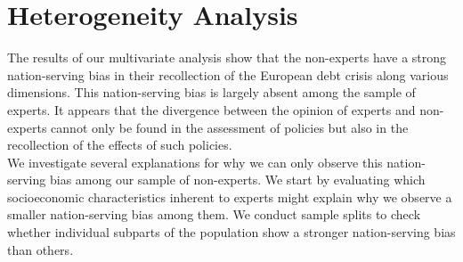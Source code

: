 
\clearpage
\section{Heterogeneity Analysis}
 
The results of our multivariate analysis show that the non-experts have a strong nation-serving bias in their recollection of the European debt crisis along various dimensions. This nation-serving bias is largely absent among the sample of experts. It appears that the divergence between the opinion of experts and non-experts cannot only be found in the assessment of policies but also in the recollection of the effects of such policies. \\
We investigate several explanations for why we can only observe this nation-serving bias among our sample of non-experts. 
We start by evaluating which socioeconomic characteristics inherent to experts might explain why we observe a smaller nation-serving bias among them. We conduct sample splits to check whether individual subparts of the population show a stronger nation-serving bias than others.
\\

